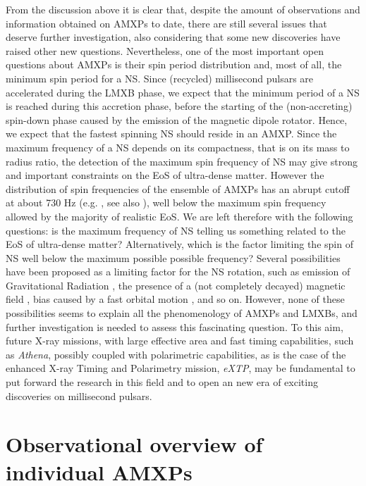 \documentclass[graybox]{svmult}
\begin{document}
From the discussion above it is clear that, despite the amount of observations and information obtained on AMXPs to date, there are still several issues that deserve further investigation, also considering that some new discoveries have raised other new questions. Nevertheless, one of the most important open questions about AMXPs is their spin period distribution and, most of all, the minimum spin period for a NS. Since (recycled) millisecond pulsars are accelerated during the LMXB phase, we expect that the minimum period of a NS is reached during this accretion phase, before the starting of the (non-accreting) spin-down phase caused by the emission of the magnetic dipole rotator. Hence, we expect that the fastest spinning NS should reside in an AMXP. Since the maximum frequency of a NS depends on its compactness, that is on its mass to radius ratio, the detection of the maximum spin frequency of NS may give strong and important constraints on the EoS of ultra-dense matter.
However the distribution of spin frequencies of the ensemble of AMXPs has an abrupt cutoff at about 730 Hz (e.g. \cite{Patruno2017b}, see also \cite{Papitto2014}), well below the maximum spin frequency allowed by the majority of realistic EoS. We are left therefore with the following questions: is the maximum frequency of NS telling us something related to the EoS of ultra-dense matter? Alternatively, which is the factor limiting the spin of NS well below the maximum possible possible frequency? Several possibilities have been proposed as a limiting factor for the NS rotation, such as emission of Gravitational Radiation \cite{Hartman2011,Papitto2011b}, the presence of a (not completely decayed) magnetic field \cite{ Patruno2012}, bias caused by a fast orbital motion \cite{Burderi2001}, and so on. However, none of these possibilities seems to explain all the phenomenology of AMXPs and LMXBs, and further investigation is needed to assess this fascinating question. To this aim, future X-ray missions, with large effective area and fast timing capabilities, such as {\it Athena}, possibly coupled with polarimetric capabilities, as is the case of the enhanced X-ray Timing and Polarimetry mission, {\it eXTP}, may be fundamental to put forward the research in this field and to open an new era of exciting discoveries on millisecond pulsars.    




\section{Observational overview of individual AMXPs}
\end{document}
